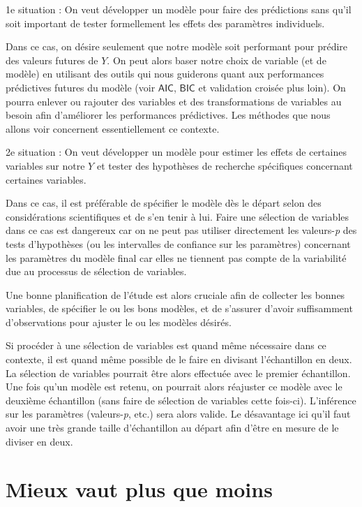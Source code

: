 \documentclass[
  11pt,
  letterpaper,
]{book}
\theoremstyle{definition}
\theoremstyle{definition}
\theoremstyle{definition}
\theoremstyle{definition}
\theoremstyle{remark}
\begin{document}
1e situation : On veut développer un modèle pour faire des prédictions sans qu'il soit important de tester formellement les effets des paramètres individuels.

Dans ce cas, on désire seulement que notre modèle soit performant pour prédire des valeurs futures de \(Y\). On peut alors baser notre choix de variable (et de modèle) en utilisant des outils qui nous guiderons quant aux performances prédictives futures du modèle (voir \(\mathsf{AIC}\), \(\mathsf{BIC}\) et validation croisée plus loin). On pourra enlever ou rajouter des variables et des transformations de variables au besoin afin d'améliorer les performances prédictives. Les méthodes que nous allons voir concernent essentiellement ce contexte.

2e situation : On veut développer un modèle pour estimer les effets de certaines variables sur notre \(Y\) et tester des hypothèses de recherche spécifiques concernant certaines variables.

Dans ce cas, il est préférable de spécifier le modèle dès le départ selon des considérations scientifiques et de s'en tenir à lui. Faire une sélection de variables dans ce cas est dangereux car on ne peut pas utiliser directement les valeurs-\emph{p} des tests d'hypothèses (ou les intervalles de confiance sur les paramètres) concernant les paramètres du modèle final car elles ne tiennent pas compte de la variabilité due au processus de sélection de variables.

Une bonne planification de l'étude est alors cruciale afin de collecter les bonnes variables, de spécifier le ou les bons modèles, et de s'assurer d'avoir suffisamment d'observations pour ajuster le ou les modèles désirés.

Si procéder à une sélection de variables est quand même nécessaire dans ce contexte, il est quand même possible de le faire en divisant l'échantillon en deux. La sélection de variables pourrait être alors effectuée avec le premier échantillon. Une fois qu'un modèle est retenu, on pourrait alors réajuster ce modèle avec le deuxième échantillon (sans faire de sélection de variables cette fois-ci). L'inférence sur les paramètres (valeurs-\emph{p}, etc.) sera alors valide. Le désavantage ici qu'il faut avoir une très grande taille d'échantillon au départ afin d'être en mesure de le diviser en deux.

\hypertarget{mieux-vaut-plus-que-moins}{%
\section{Mieux vaut plus que moins}\label{mieux-vaut-plus-que-moins}}
\end{document}
